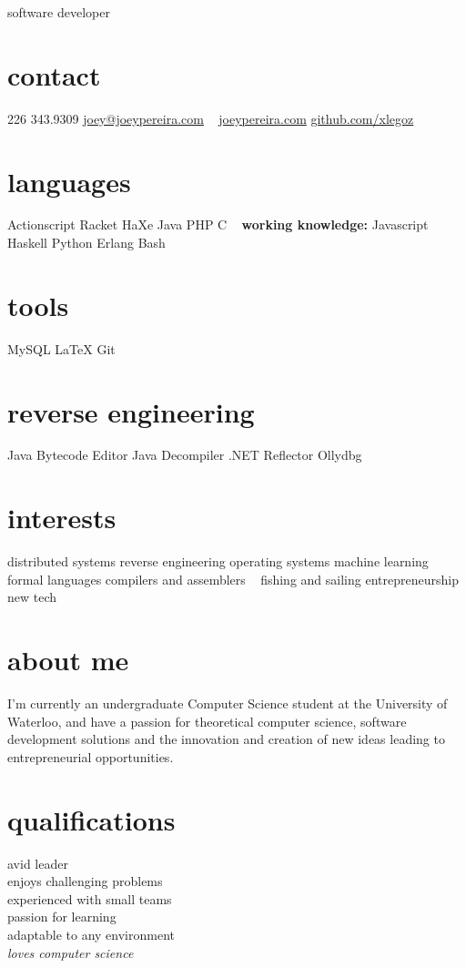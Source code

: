 \documentclass[]{friggeri-cv}
\begin{document}
       {software developer}

\begin{aside}
  \section{contact}
    226 343.9309
    \href{mailto:joey@joeypereira.com}{joey@joeypereira.com}
    ~
    \href{http://joeypereira.com}{joeypereira.com}
    \href{http://www.github.com/xlegoz}{github.com/xlegoz}
  \section{languages}
	Actionscript
	Racket
	HaXe
	Java
	PHP
	C
	~
	\textbf{working knowledge:}
	Javascript
	Haskell
	Python
	Erlang
	Bash	
  \section{tools}
    MySQL
    \LaTeX
	Git
  \section{reverse engineering}
  	Java Bytecode Editor
  	Java Decompiler
  	.NET Reflector
  	Ollydbg
  \section{interests}
  	distributed systems
  	reverse engineering
  	operating systems
  	machine learning
  	formal languages
  	compilers and assemblers
  	~
  	fishing and sailing
  	entrepreneurship
  	new tech
\end{aside}


\section{about me}
I'm currently an undergraduate Computer Science student at the University of Waterloo, and have a passion for theoretical computer science, software development solutions and the innovation and creation of new ideas leading to entrepreneurial opportunities.
\section{qualifications}
\begin{multicols}{3}
 avid leader \\ enjoys challenging problems \\ experienced with small teams \\ passion for learning \\ adaptable to any environment \\ \em{loves} computer science
\end{multicols}
\end{document}
